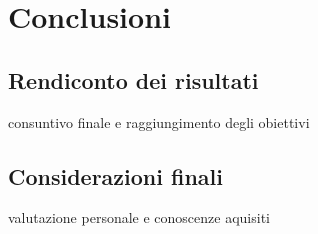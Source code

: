 \chapter{Conclusioni}
\label{cap:conclusioni}

\section{Rendiconto dei risultati}
consuntivo finale e raggiungimento degli obiettivi

\section{Considerazioni finali}
valutazione personale e conoscenze aquisiti
